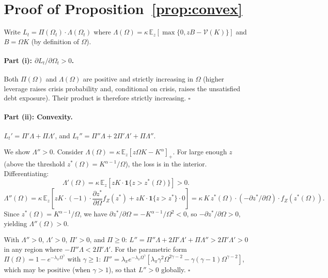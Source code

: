 \documentclass[12pt]{article}
\newcommand{\E}{\mathbb{E}}
\begin{document}
\section{Proof of Proposition~\ref{prop:convex}}
\label{app:prop3}

Write $L_t = \Pi(\Omega_t) \cdot \Lambda(\Omega_t)$ where
$\Lambda(\Omega) = \kappa\,\E_z[\max\{0, zB - \mathcal{V}(K)\}]$
and $B = \Omega K$ (by definition of $\Omega$).

\paragraph{Part (i): $\partial L_t / \partial \Omega_t > 0$.}
Both $\Pi(\Omega)$ and $\Lambda(\Omega)$ are positive and strictly increasing in $\Omega$
(higher leverage raises crisis probability and, conditional on crisis, raises the
unsatisfied debt exposure). Their product is therefore strictly increasing. $\square$

\paragraph{Part (ii): Convexity.}

$L_t' = \Pi' \Lambda + \Pi \Lambda'$, and
$L_t'' = \Pi'' \Lambda + 2\Pi' \Lambda' + \Pi \Lambda''$.

We show $\Lambda'' > 0$. Consider $\Lambda(\Omega) = \kappa\,\E_z[z\Omega K - K^\alpha]_+$.
For large enough $z$ (above the threshold $z^*(\Omega) = K^{\alpha-1}/\Omega$), the
loss is in the interior. Differentiating:
\[
\Lambda'(\Omega) = \kappa\,\E_z\left[z K \cdot \mathbf{1}\{z > z^*(\Omega)\}\right] > 0.
\]
\[
\Lambda''(\Omega) = \kappa\,\E_z\left[z K \cdot (-1) \cdot \frac{\partial z^*}{\partial \Omega} f_Z(z^*) + z K \cdot \mathbf{1}\{z > z^*\} \cdot 0\right]
= \kappa\, K\, z^*(\Omega) \cdot (-\partial z^*/\partial \Omega) \cdot f_Z(z^*(\Omega)).
\]
Since $z^*(\Omega) = K^{\alpha-1}/\Omega$, we have $\partial z^*/\partial \Omega = -K^{\alpha-1}/\Omega^2 < 0$, so
$-\partial z^*/\partial \Omega > 0$, yielding $\Lambda''(\Omega) > 0$.

With $\Lambda'' > 0$, $\Lambda' > 0$, $\Pi' > 0$, and $\Pi \geq 0$:
$L'' = \Pi''\Lambda + 2\Pi'\Lambda' + \Pi\Lambda'' > 2\Pi'\Lambda' > 0$
in any region where $-\Pi''\Lambda < 2\Pi'\Lambda'$.
For the parametric form $\Pi(\Omega) = 1 - e^{-\lambda_\pi \Omega^\gamma}$ with $\gamma \geq 1$:
$\Pi'' = \lambda_\pi e^{-\lambda_\pi \Omega^\gamma}[\lambda_\pi \gamma^2 \Omega^{2\gamma-2} - \gamma(\gamma-1)\Omega^{\gamma-2}]$,
which may be positive (when $\gamma > 1$), so that $L'' > 0$ globally. $\square$
\end{document}
